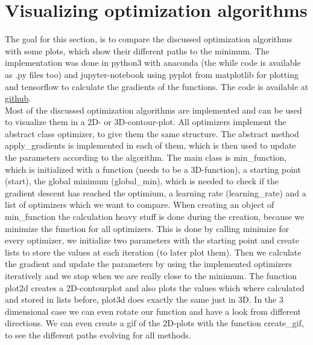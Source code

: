 \documentclass[aodsor,preprint]{imsart}
\numberwithin{equation}{section}
\theoremstyle{plain}
\begin{document}
\section{Visualizing optimization algorithms}
The goal for this section, is to compare the discussed optimization algorithms with some plots, which show their different paths to the minimum. The implementation was done in python3 with anaconda (the while code is available as .py files too) and jupyter-notebook using pyplot from matplotlib for plotting and tensorflow to calculate the gradients of the functions. The code is available at \href{https://github.com/}{github}. \\
Most of the discussed optimization algorithms are implemented and can be used to visualize them in a 2D- or 3D-contour-plot. All optimizers implement the abstract class optimizer, to give them the same structure. The abstract method apply\_gradients is implemented in each of them, which is then used to update the parameters according to the algorithm. The main class is min\_function, which is initialized with a function (needs to be a 3D-function), a starting point (start), the global minimum (global\_min), which is needed to check if the gradient descent has reached the optimium, a learning rate (learning\_rate) and a list of optimizers which we want to compare. When creating an object of min\_function the calculation heavy stuff is done during the creation, because we minimize the function for all optimizers. This is done by calling minimize for every optimizer, we initialize two parameters with the starting point and create lists to store the values at each iteration (to later plot them). Then we calculate the gradient and update the parameters by using the implemented optimizers iteratively and we stop when we are really close to the minimum. The function plot2d creates a 2D-contourplot and also plots the values which where calculated and stored in lists before, plot3d does exactly the same just in 3D. In the 3 dimensional case we can even rotate our function and have a look from different directions. We can even create a gif of the 2D-plots with the function create\_gif, to see the different paths evolving for all methods.
\end{document}
